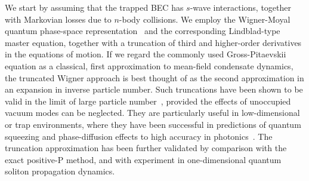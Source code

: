 \documentclass[aps,prl,twocolumn,showpacs,amsmath,amssymb,superscriptaddress,flushbottom,noraggedfooter]{revtex4-1}
\begin{document}
We start by assuming that the trapped BEC has $s$-wave interactions,
together with Markovian losses due to $n$-body collisions.
We employ the Wigner-Moyal quantum phase-space representation~\cite{Gardiner2004}
and the corresponding Lindblad-type master equation,
together with a truncation of third and higher-order derivatives in the equations of motion.
If we regard the commonly used Gross-Pitaevskii equation as a classical,
first approximation to mean-field condensate dynamics,
the truncated Wigner approach is best thought of as the second approximation
in an expansion in inverse particle number.
Such truncations have been shown to be valid in the limit of large particle number~\cite{Drummond1993,Steel1998,Sinatra2002},
provided the effects of unoccupied vacuum modes can be neglected.
They are particularly useful in low-dimensional or trap environments,
where they have been successful in predictions of quantum squeezing
and phase-diffusion effects to high accuracy in photonics~\cite{Corney2008}.
The truncation approximation has been further validated by comparison
with the exact positive-P method,
and with experiment in one-dimensional quantum soliton propagation dynamics.
\end{document}
